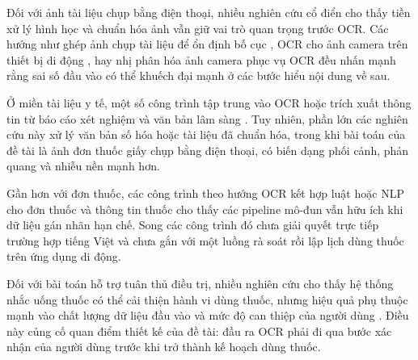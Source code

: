 \documentclass[12pt,a4paper]{report}
\begin{document}
Đối với ảnh tài liệu chụp bằng điện thoại, nhiều nghiên cứu cổ điển cho thấy tiền xử lý hình học và chuẩn hóa ảnh vẫn giữ vai trò quan trọng trước OCR. Các hướng như ghép ảnh chụp tài liệu để ổn định bố cục \cite{camera_doc_mosaic}, OCR cho ảnh camera trên thiết bị di động \cite{camera_kanji_ocr}, hay nhị phân hóa ảnh camera phục vụ OCR \cite{camera_binarization} đều nhấn mạnh rằng sai số đầu vào có thể khuếch đại mạnh ở các bước hiểu nội dung về sau.

Ở miền tài liệu y tế, một số công trình tập trung vào OCR hoặc trích xuất thông tin từ báo cáo xét nghiệm và văn bản lâm sàng \cite{medical_report_ocr,biobert,clinicalbert,medication_ie}. Tuy nhiên, phần lớn các nghiên cứu này xử lý văn bản số hóa hoặc tài liệu đã chuẩn hóa, trong khi bài toán của đề tài là ảnh đơn thuốc giấy chụp bằng điện thoại, có biến dạng phối cảnh, phản quang và nhiễu nền mạnh hơn.

Gần hơn với đơn thuốc, các công trình theo hướng OCR kết hợp luật hoặc NLP cho đơn thuốc và thông tin thuốc \cite{prescription_ocr_tesseract,medication_ie} cho thấy các pipeline mô-đun vẫn hữu ích khi dữ liệu gán nhãn hạn chế. Song các công trình đó chưa giải quyết trực tiếp trường hợp tiếng Việt và chưa gắn với một luồng rà soát rồi lập lịch dùng thuốc trên ứng dụng di động.

Đối với bài toán hỗ trợ tuân thủ điều trị, nhiều nghiên cứu cho thấy hệ thống nhắc uống thuốc có thể cải thiện hành vi dùng thuốc, nhưng hiệu quả phụ thuộc mạnh vào chất lượng dữ liệu đầu vào và mức độ can thiệp của người dùng \cite{who_adherence,osterberg2005}. Điều này củng cố quan điểm thiết kế của đề tài: đầu ra OCR phải đi qua bước xác nhận của người dùng trước khi trở thành kế hoạch dùng thuốc.
\end{document}

